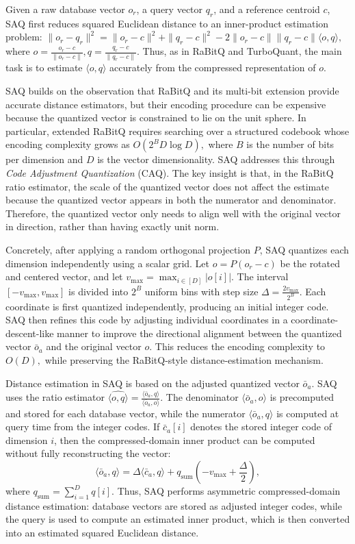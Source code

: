 \documentclass[sigconf]{acmart}
\begin{document}
Given a raw database vector $o_r$, a query vector $q_r$, and a reference centroid $c$, SAQ first reduces squared Euclidean distance to an inner-product estimation problem:
\(
\|o_r-q_r\|^2
=
\|o_r-c\|^2+\|q_r-c\|^2
-
2\|o_r-c\|\|q_r-c\|\langle o,q\rangle,
\)
where
\(
o=\frac{o_r-c}{\|o_r-c\|},
q=\frac{q_r-c}{\|q_r-c\|}.
\)
Thus, as in RaBitQ and TurboQuant, the main task is to estimate $\langle o,q\rangle$ accurately from the compressed representation of $o$.

SAQ builds on the observation that RaBitQ and its multi-bit extension provide accurate distance estimators, but their encoding procedure can be expensive because the quantized vector is constrained to lie on the unit sphere. 
In particular, extended RaBitQ requires searching over a structured codebook whose encoding complexity grows as
\(
O(2^B D \log D),
\)
where $B$ is the number of bits per dimension and $D$ is the vector dimensionality. 
SAQ addresses this through \emph{Code Adjustment Quantization} (CAQ). 
The key insight is that, in the RaBitQ ratio estimator, the scale of the quantized vector does not affect the estimate because the quantized vector appears in both the numerator and denominator. 
Therefore, the quantized vector only needs to align well with the original vector in direction, rather than having exactly unit norm.

Concretely, after applying a random orthogonal projection $P$, SAQ quantizes each dimension independently using a scalar grid. 
Let
\(
o = P(o_r-c)
\)
be the rotated and centered vector, and let
\(
v_{\max} = \max_{i\in[D]} |o[i]|.
\)
The interval $[-v_{\max},v_{\max}]$ is divided into $2^B$ uniform bins with step size
\(
\Delta = \frac{2v_{\max}}{2^B}.
\)
Each coordinate is first quantized independently, producing an initial integer code. 
SAQ then refines this code by adjusting individual coordinates in a coordinate-descent-like manner to improve the directional alignment between the quantized vector $\bar{o}_a$ and the original vector $o$. 
This reduces the encoding complexity to
\(
O(D),
\)
while preserving the RaBitQ-style distance-estimation mechanism.

Distance estimation in SAQ is based on the adjusted quantized vector $\bar{o}_a$. SAQ uses the ratio estimator
\(
\widehat{\langle o,q\rangle}
=
\frac{\langle \bar{o}_a,q\rangle}{\langle \bar{o}_a,o\rangle}.
\)
The denominator $\langle \bar{o}_a,o\rangle$ is precomputed and stored for each database vector, while the numerator $\langle \bar{o}_a,q\rangle$ is computed at query time from the integer codes. 
If $\bar{c}_a[i]$ denotes the stored integer code of dimension $i$, then the compressed-domain inner product can be computed without fully reconstructing the vector:
\[
\langle \bar{o}_a,q\rangle
=
\Delta \langle \bar{c}_a,q\rangle
+
q_{\mathrm{sum}}
\left(
-v_{\max}+\frac{\Delta}{2}
\right),
\]
where
\(
q_{\mathrm{sum}}=\sum_{i=1}^{D}q[i].
\)
Thus, SAQ performs asymmetric compressed-domain distance estimation: database vectors are stored as adjusted integer codes, while the query is used to compute an estimated inner product, which is then converted into an estimated squared Euclidean distance.
\end{document}
